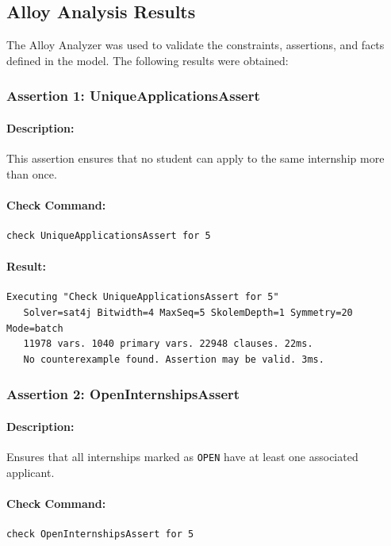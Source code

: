 \vspace{0.5cm}

\subsection{Alloy Analysis Results}

The Alloy Analyzer was used to validate the constraints, assertions, and facts defined in the model. The following results were obtained:

\subsubsection{Assertion 1: UniqueApplicationsAssert}
\paragraph{Description:} This assertion ensures that no student can apply to the same internship more than once.
\paragraph{Check Command:}
\begin{verbatim}
check UniqueApplicationsAssert for 5
\end{verbatim}
\paragraph{Result:} 
\begin{verbatim}
Executing "Check UniqueApplicationsAssert for 5"
   Solver=sat4j Bitwidth=4 MaxSeq=5 SkolemDepth=1 Symmetry=20 Mode=batch
   11978 vars. 1040 primary vars. 22948 clauses. 22ms.
   No counterexample found. Assertion may be valid. 3ms.
\end{verbatim}

\subsubsection{Assertion 2: OpenInternshipsAssert}
\paragraph{Description:} Ensures that all internships marked as \texttt{OPEN} have at least one associated applicant.
\paragraph{Check Command:}
\begin{verbatim}
check OpenInternshipsAssert for 5
\end{verbatim}
